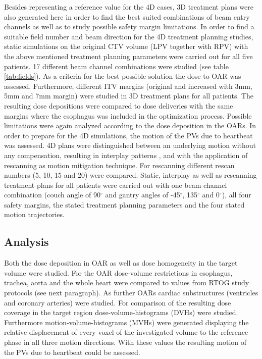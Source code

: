 Besides representing a reference value for the 4D cases, 3D treatment plans were also generated here 
in order to find the best suited combinations of beam entry channels as well as to study possible safety margin limitations. In order to find 
a suitable field number and beam direction for the 4D treatment planning 
studies, static simulations on the original CTV volume (LPV together with RPV) with the above mentioned treatment planning parameters were 
carried out for all five patients. 17 different beam channel combinations were studied (see table \ref{tab:fields}). As a criteria for the 
best possible solution the dose to OAR was assessed. Furthermore, different ITV margins (original and increased with 3mm, 5mm and 7mm margin) 
were studied in 3D treatment plans for all patients. The resulting dose depositions were compared to dose deliveries with the same margins 
where the esophagus was included in the optimization process. Possible limitations were again analyzed according to the dose deposition in the OARs. \newline
\newline
In order to prepare for the 4D simulations, the motion of the PVs due to heartbeat was assessed. 
4D plans were distinguished between an underlying motion without any compensation, resulting in interplay patterns \cite{Phi92, Ber08}, 
and with the application of rescanning \cite{Phi92} as motion mitigation technique. For rescanning different rescan numbers 
(5, 10, 15 and 20) were compared. Static, interplay as well as rescanning treatment plans for all patients were carried out with one 
beam channel combination (couch angle of 90$^{\circ}$ and gantry angles of -45$^{\circ}$, 135$^{\circ}$ and 0$^{\circ}$), all four safety 
margins, the stated treatment planning parameters and the four stated motion trajectories. 


\subsection{Analysis}

Both the dose deposition in OAR as well as dose homogeneity in the target volume were studied. For the OAR dose-volume restrictions in 
esophagus, trachea, aorta and the whole heart were compared to values from RTOG study protocols (see next paragraph). 
As further OARs cardiac substructures (ventricles and coronary arteries) were studied. 
For comparison of the resulting dose coverage in the target region dose-volume-histograms (DVHs) were studied. Furthermore 
motion-volume-histograms (MVHs) \cite{Ric13} were generated displaying the relative displacement of every voxel of the investigated volume to 
the reference phase in all three motion directions. With these values the resulting motion of the PVs due to heartbeat could be assessed. 

